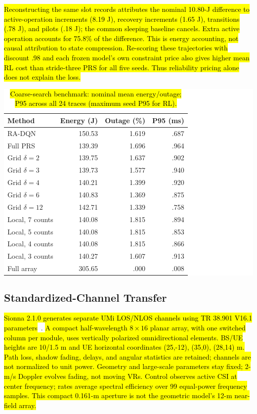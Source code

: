 \documentclass[letterpaper,conference]{IEEEtran}
\newcommand{\rev}[1]{\hl{#1}}
\newcommand{\revbox}[1]{\colorbox{white}{#1}}
\newcommand{\rev}[1]{\hl{#1}}
\newcommand{\revbox}[1]{\colorbox{yellow}{#1}}
\begin{document}
\rev{Reconstructing the same slot records attributes the nominal 10.80-J difference to active-operation increments (8.19 J), recovery increments (1.65 J), transitions (.78 J), and pilots (.18 J); the common sleeping baseline cancels. Extra active operation accounts for 75.8\% of the difference. This is energy accounting, not causal attribution to state compression. Re-scoring these trajectories with discount .98 and each frozen model's own constraint price also gives higher mean RL cost than stride-three PRS for all five seeds. Thus reliability pricing alone does not explain the loss.}
\begin{table}[!t]
\caption{\rev{Coarse-search benchmark: nominal mean energy/outage; P95 across all 24 traces (maximum seed P95 for RL).}}
\label{tab:budget}
\centering\footnotesize
\setlength{\tabcolsep}{4pt}
\revbox{\begin{tabular}{@{}lrrr@{}}
\toprule
Method & Energy (J) & Outage (\%) & P95 (ms)\\
\midrule
RA-DQN & 150.53 & 1.619 & .687\\
Full PRS & 139.39 & 1.696 & .964\\
Grid $\delta=2$ & 139.75 & 1.637 & .902\\
Grid $\delta=3$ & 139.73 & 1.577 & .940\\
Grid $\delta=4$ & 140.21 & 1.399 & .920\\
Grid $\delta=6$ & 140.83 & 1.369 & .875\\
Grid $\delta=12$ & 142.71 & 1.339 & .758\\
Local, 7 counts & 140.08 & 1.815 & .894\\
Local, 5 counts & 140.08 & 1.815 & .853\\
Local, 4 counts & 140.08 & 1.815 & .866\\
Local, 3 counts & 140.27 & 1.607 & .913\\
Full array & 305.65 & .000 & .008\\
\bottomrule
\end{tabular}}
\end{table}

\subsection{Standardized-Channel Transfer}
\rev{Sionna 2.1.0 generates separate UMi LOS/NLOS channels using TR 38.901 V16.1 parameters}~\cite{tr38901v16,sionna210}. \rev{A compact half-wavelength $8\times16$ planar array, with one switched column per module, uses vertically polarized omnidirectional elements. BS/UE heights are 10/1.5 m and UE horizontal coordinates (25,-12), (35,0), (28,14) m. Path loss, shadow fading, delays, and angular statistics are retained; channels are not normalized to unit power. Geometry and large-scale parameters stay fixed; 2-m/s Doppler evolves fading, not moving VRs. Control observes active CSI at center frequency; rates average spectral efficiency over 99 equal-power frequency samples. This compact 0.161-m aperture is not the geometric model's 12-m near-field array.}
\end{document}
